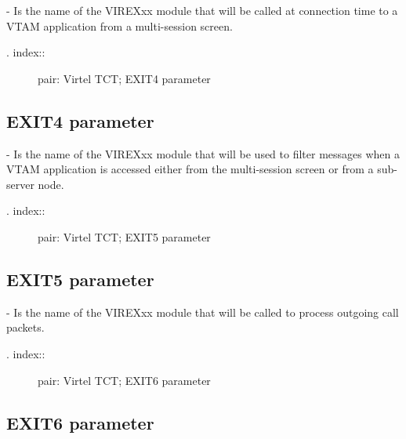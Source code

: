 \documentclass[letterpaper,10pt,english]{sphinxmanual}
\begin{document}
 - Is the name of the VIREXxx module that will be called at connection time to a VTAM application from a multi-session screen.
\begin{description}
\item[{. index::}] \leavevmode
pair: Virtel TCT; EXIT4 parameter

\end{description}


\subsection{EXIT4 parameter}
\label{\detokenize{Installation_Guide:exit4-parameter}}
\begin{sphinxVerbatim}[commandchars=\\\{\}]
 
\end{sphinxVerbatim}

 - Is the name of the VIREXxx module that will be used to filter messages when a VTAM application is accessed either from the multi-session screen or from a sub-server node.
\begin{description}
\item[{. index::}] \leavevmode
pair: Virtel TCT; EXIT5 parameter

\end{description}


\subsection{EXIT5 parameter}
\label{\detokenize{Installation_Guide:exit5-parameter}}
\begin{sphinxVerbatim}[commandchars=\\\{\}]
 
\end{sphinxVerbatim}

 - Is the name of the VIREXxx module that will be called to process outgoing call packets.
\begin{description}
\item[{. index::}] \leavevmode
pair: Virtel TCT; EXIT6 parameter

\end{description}


\subsection{EXIT6 parameter}
\label{\detokenize{Installation_Guide:exit6-parameter}}
\begin{sphinxVerbatim}[commandchars=\\\{\}]
 
\end{sphinxVerbatim}
\end{document}
